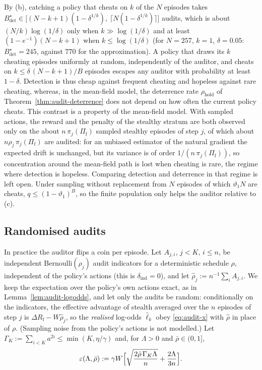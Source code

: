 \begin{remark}\label{rem:audit-detect-deter}
By (b), catching a policy that cheats on $k$ of the $N$ episodes takes
$B^\star_{\det}\in\bigl[(N-k+1)(1-\delta^{1/k}),\ \lceil N(1-\delta^{1/k})\rceil\bigr]$ audits, which is about $(N/k)\log(1/\delta)$ only when $k\gg\log(1/\delta)$ and at least $(1-e^{-1})(N-k+1)$ when $k\le\log(1/\delta)$ (for $N=257$, $k=1$, $\delta=0.05$: $B^\star_{\det}=245$, against $770$ for the approximation). A policy that draws its $k$ cheating episodes uniformly at random, independently of the auditor, and cheats on
$k\le\delta\,(N-k+1)/B$ episodes escapes any auditor with probability at least
$1-\delta$. Detection is thus cheap against frequent cheating and hopeless
against rare cheating, whereas, in the mean-field model, the deterrence rate $\rho_{\mathrm{hold}}$ of
Theorem~\ref{thm:audit-deterrence} does not depend on how often the current
policy cheats. This contrast is a property of the mean-field model. With sampled actions, the reward and the penalty of the stealthy stratum are both observed only on the about $n\,\pi_j(\Pi_{\mathrm f})$ sampled stealthy episodes of step $j$, of which about $n\rho_j\,\pi_j(\Pi_{\mathrm f})$ are audited: for an unbiased estimator of the natural gradient the expected drift is unchanged, but its variance is of order $1/(n\,\pi_j(\Pi_{\mathrm f}))$, so concentration around the mean-field path is lost when cheating is rare, the regime where detection is hopeless. Comparing detection and deterrence in that regime is left open. Under sampling without replacement from $N$ episodes of which
$\vartheta_1 N$ are cheats, $q\le(1-\vartheta_1)^B$, so the finite population
only helps the auditor relative to (c).
\end{remark}

\subsection{Randomised audits}

In practice the auditor flips a coin per episode. Let $A_{j,i}$,
$j<K$, $i\le n$, be independent Bernoulli$(\rho_j)$ audit indicators for a
deterministic schedule $\rho$, independent of the policy's actions (this is
$\delta_{\mathrm{ind}}=0$), and let $\hat\rho_j:=n^{-1}\sum_iA_{j,i}$. We keep
the expectation over the policy's own actions exact, as in
Lemma~\ref{lem:audit-logodds}, and let only the audits be random: conditionally
on the indicators, the effective advantage of stealth averaged over the $n$
episodes of step $j$ is $\Delta R_{\mathrm f}-W\hat\rho_j$, so the \emph{realised}
log-odds $\hat\ell_k$ obey \eqref{eq:audit-x} with $\hat\rho$ in place of $\rho$.
(Sampling noise from the policy's actions is not modelled.) Let
$\Gamma_K:=\sum_{i<K}a^{2i}\le\min(K,\eta/\gamma)$ and, for $\Lambda>0$ and
$\bar\rho\in(0,1]$,
\[
  \varepsilon(\Lambda,\bar\rho):=\gamma W\Bigl[\sqrt{\frac{2\bar\rho\,\Gamma_K\Lambda}{n}}
  +\frac{2\Lambda}{3n}\Bigr].
\]

